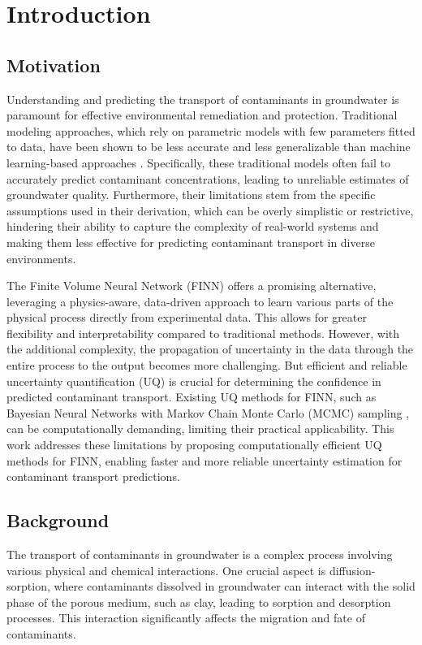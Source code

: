 \chapter{Introduction}

\section{Motivation}
Understanding and predicting the transport of contaminants in groundwater is paramount for effective environmental remediation and protection. Traditional modeling approaches, which rely on parametric models with few parameters fitted to data, have been shown to be less accurate and less generalizable than machine learning-based approaches \cite{finn}. Specifically, these traditional models often fail to accurately predict contaminant concentrations, leading to unreliable estimates of groundwater quality. Furthermore, their limitations stem from the specific assumptions used in their derivation, which can be overly simplistic or restrictive, hindering their ability to capture the complexity of real-world systems and making them less effective for predicting contaminant transport in diverse environments.

The Finite Volume Neural Network (FINN) \cite{finn} offers a promising alternative, leveraging a physics-aware, data-driven approach to learn various parts of the physical process directly from experimental data. This allows for greater flexibility and interpretability compared to traditional methods. However, with the additional complexity, the propagation of uncertainty in the data through the entire process to the output becomes more challenging. But efficient and reliable uncertainty quantification (UQ) is crucial for determining the confidence in predicted contaminant transport. Existing UQ methods for FINN, such as Bayesian Neural Networks with Markov Chain Monte Carlo (MCMC) sampling \cite{bardenet2017markov}, can be computationally demanding, limiting their practical applicability. This work addresses these limitations by proposing computationally efficient UQ methods for FINN, enabling faster and more reliable uncertainty estimation for contaminant transport predictions.


\section{Background}
The transport of contaminants in groundwater is a complex process involving various physical and chemical interactions. One crucial aspect is diffusion-sorption, where contaminants dissolved in groundwater can interact with the solid phase of the porous medium, such as clay, leading to sorption and desorption processes. This interaction significantly affects the migration and fate of contaminants.

